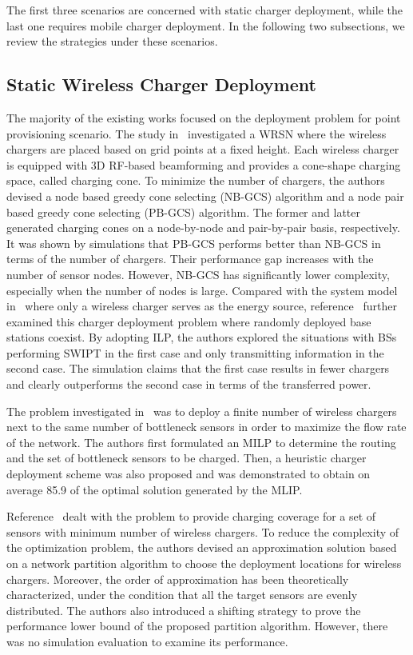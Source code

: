 \documentclass[twocolumn,10pt]{IEEEtran}
\begin{document}
The first three scenarios are concerned with static charger deployment, while the last one requires mobile charger deployment. In the following two subsections, we review the strategies under these scenarios. 
 
 
\subsection{Static Wireless Charger Deployment}


The majority of the existing works \cite{Erol-Kantarci2014,J.2014Liao,Y.2014Pang, T.2015He,H.2014Dai,HDai2014} focused on the deployment problem for point provisioning scenario.
The study in~\cite{J.2014Liao} investigated a WRSN where the wireless chargers are placed based on grid points at a fixed height. Each wireless charger is equipped with 3D RF-based beamforming and provides a cone-shape charging space, called charging cone. To minimize the number of chargers, the authors devised a node based greedy cone selecting (NB-GCS) algorithm and a node pair based greedy cone selecting (PB-GCS) algorithm. The former and latter generated charging cones on a node-by-node and pair-by-pair basis, respectively. It was shown by simulations that PB-GCS performs better than NB-GCS in terms of the number of chargers. Their performance gap increases with the number of sensor nodes. However, NB-GCS has significantly lower complexity, especially when the number of nodes is large. Compared with the system model in~\cite{J.2014Liao} where only a wireless charger serves as the energy source, reference~\cite{Erol-Kantarci2014} further examined this charger deployment problem where randomly deployed base stations coexist.  By adopting ILP, the authors explored the situations with BSs performing SWIPT in the first case and only transmitting information in the second case. The simulation claims that the first case results in fewer chargers and clearly outperforms the second case in terms of the transferred power.

The problem investigated in~\cite{T.2015He} was to deploy a finite number of wireless chargers next to the same number of bottleneck sensors in order to maximize the flow rate of the network. The authors first formulated an MILP to determine the routing and the set of bottleneck sensors to be charged. Then, a heuristic charger deployment scheme was also proposed and was demonstrated to obtain on average 85.9 of the optimal solution generated by the MLIP.  


Reference~\cite{Y.2014Pang} dealt with the problem to provide charging coverage for a set of sensors with minimum number of wireless chargers. To reduce the complexity of the optimization problem, the authors devised an approximation solution based on a network partition algorithm to choose the deployment locations for wireless chargers. Moreover, the order of approximation has been theoretically characterized, under the condition that all the target sensors are evenly distributed. The authors also introduced a shifting strategy to prove the performance lower bound of the proposed partition algorithm. However, there was no simulation evaluation to examine its performance. 
\end{document}

